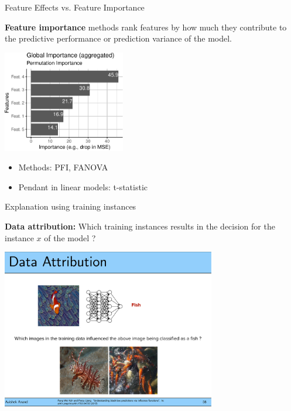 \documentclass[11pt,compress,t,notes=noshow, aspectratio=169, xcolor=table]{beamer}
\begin{document}
\begin{frame}{Feature Effects vs. Feature Importance}

	\textbf{Feature importance} methods rank features by how much they contribute to the predictive performance or prediction variance of the model.
	\begin{center}
		\includegraphics[page=1, width=0.4\textwidth]{figure/feature-importance}
	\end{center}
	\begin{itemize}
		\item Methods: PFI, FANOVA
		\item Pendant in linear models: t-statistic
	\end{itemize}

\end{frame}


\begin{frame}{Explanation using training instances~}

	\textbf{Data attribution:} Which training instances results in the decision for the instance $x$ of the model ?
	\begin{center}
		\includegraphics[page=1, width=0.7\textwidth]{figure/fish-attribution.pdf}
	\end{center}
\end{frame}
\end{document}
